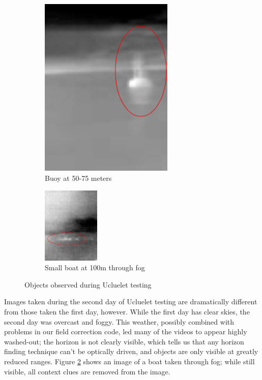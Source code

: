 \begin{figure}[h]
\centering
\begin{subfigure}{0.45\textwidth}
 \centering
 \includegraphics[width=0.7\textwidth]{"./image/buoy_circled"}
 \caption{Buoy at 50-75 meters}
 \label{fig:uce_imgs:sub1}
\end{subfigure}
\begin{subfigure}{0.45\textwidth}
 \centering
 \includegraphics[width=0.3\textwidth]{"./image/shore_fog_circled"}
 \caption{Small boat at 100m through fog}
 \label{fig:uce_imgs:sub2}
\end{subfigure}
\caption{Objects observed during Ucluelet testing}
\label{fig:uce_imgs}
\end{figure}


Images taken during the second day of Ucluelet testing are dramatically different from those taken the first day, however. While the first day has clear skies, the second day was overcast and foggy. This weather, possibly combined with problems in our field correction code, led many of the videos to appear highly washed-out; the horizon is not clearly visible, which tells us that any horizon finding technique can't be optically driven, and objects are only visible at greatly reduced ranges. Figure \ref{fig:uce_imgs:sub2} shows an image of a boat taken through fog; while still visible, all context clues are removed from the image.



